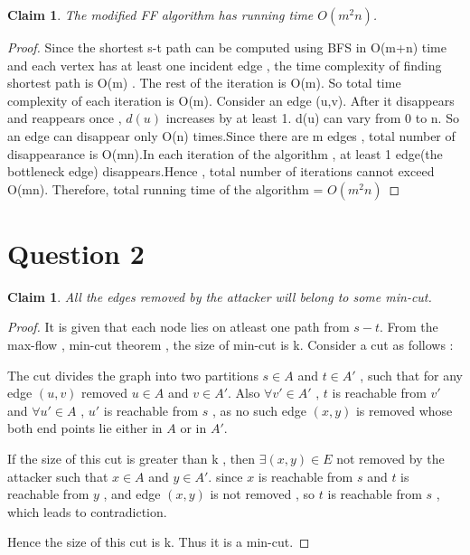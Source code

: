 \documentclass[11pt]{article}
\newtheorem{claim}[theorem]{Claim}
\begin{document}
\begin{claim}
The modiﬁed FF algorithm has running time $O(m^2n)$.
\end{claim}
\begin{proof}
	Since the shortest s-t path can be computed using BFS in O(m+n) time and each vertex has at least one incident edge , the time complexity of finding shortest path is O(m) . The rest of the iteration is O(m). So total time complexity of each iteration is O(m).
	Consider an edge (u,v). After it disappears and reappears once , $d(u)$ increases by at least 1. d(u) can vary from 0 to n.    So an edge can disappear only O(n) times.Since there are m edges , total number of disappearance is O(mn).In each iteration of the algorithm , at least 1 edge(the bottleneck edge) disappears.Hence , total number of iterations cannot exceed O(mn). 
	Therefore, total running time of the algorithm = $O(m^2n)$
\end{proof}
\pagebreak
\section*{Question 2}
\begin{claim}
All the edges removed by the attacker will belong to some min-cut.
\label{mincut}
\end{claim}
\begin{proof}
It is given that each node lies on atleast one path from $s-t$.
From the max-flow , min-cut theorem , the size of min-cut is k. Consider a cut as follows :

The cut divides the graph into two partitions $s \in A$ and $t \in A'$ , such that for any edge $(u,v)$ removed $u \in A$ and $v \in A'$. Also $\forall v' \in A'$ , $t$ is reachable from $v'$ and $\forall u' \in A $ , $u'$ is reachable from $s$ , as no such edge $(x,y)$ is removed whose both end points lie either in $A$ or in $A'$.

If the size of this cut is greater than k , then $\exists (x,y) \in E$ not removed by the attacker such that $x \in A$ and $y \in A'$.
since $x$ is reachable from $s$ and $t$ is reachable from $y$ , and edge $(x,y)$ is not removed , so $t$ is reachable from $s$ , which leads to contradiction. 

Hence the size of this cut is k. Thus it is a min-cut.
\end{proof}
\end{document}
